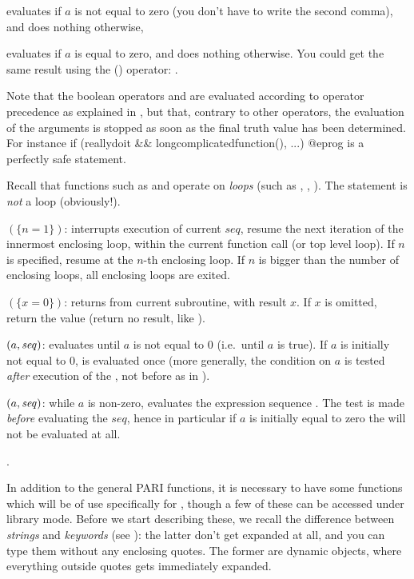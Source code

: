  evaluates  if $a$ is not equal to zero
(you don't have to write the second comma), and does nothing otherwise,

 evaluates  if $a$ is equal to zero, and
does nothing otherwise. You could get the same result using the \kbd{!}
() operator: .

Note that the boolean operators \kbd{\&\&} and \kbd{||} are evaluated
according to operator precedence as explained in , but
that, contrary to other operators, the evaluation of the arguments is stopped
as soon as the final truth value has been determined. For instance
\bprog
    if (reallydoit && longcomplicatedfunction(), ...)%
@eprog
\noindent is a perfectly safe statement.

Recall that functions such as  and  operate on
\emph{loops} (such as , , ). The 
statement is \emph{not} a loop (obviously!).

$(\{n=1\})$: interrupts execution of current $seq$,
resume the next iteration of the innermost enclosing loop, within the
current function call (or top level loop). If $n$ is specified, resume at
the $n$-th enclosing loop. If $n$ is bigger than the number of enclosing
loops, all enclosing loops are exited.

$(\{x=0\})$: returns from current subroutine, with
result $x$. If $x$ is omitted, return the  value (return no
result, like ).

$(a,\hbox{\it seq\/})$: evaluates  until $a$ is not
equal to 0 (i.e.~until $a$ is true). If $a$ is initially not equal to 0,
 is evaluated once (more generally, the condition on $a$ is tested
\emph{after} execution of the , not before as in ).

$(a,\hbox{\it seq\/})$: while $a$ is non-zero, evaluates the
expression sequence . The test is made \emph{before} evaluating
the $seq$, hence in particular if $a$ is initially equal to zero the
 will not be evaluated at all.

.
\label{se:gp_program}

  In addition to the general PARI functions, it is necessary to have some
functions which will be of use specifically for , though a few of these can
be accessed under library mode. Before we start describing these, we recall
the difference between \emph{strings} and \emph{keywords} (see
): the latter don't get expanded at all, and you can type
them without any enclosing quotes. The former are dynamic objects, where
everything outside quotes gets immediately expanded.

